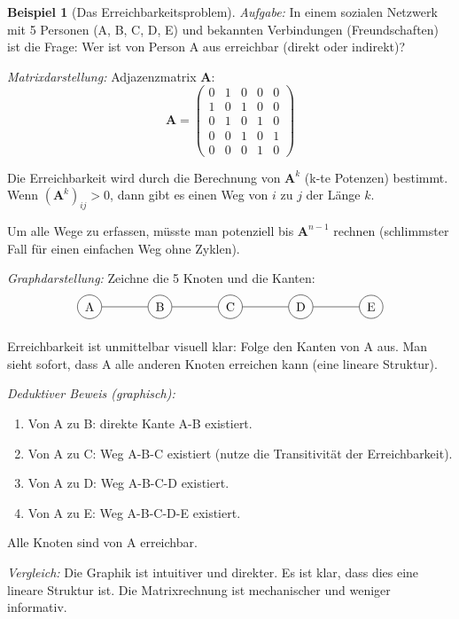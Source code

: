 \documentclass[12pt, a4paper]{article}
\theoremstyle{definition}
\newtheorem{example}[theorem]{Beispiel}
\theoremstyle{remark}
\newcommand{\vA}{\bm{A}}
\begin{document}
\begin{example}[Das Erreichbarkeitsproblem]
\label{ex:erreichbarkeitsproblem}
\emph{Aufgabe:} In einem sozialen Netzwerk mit 5 Personen (A, B, C, D, E) und bekannten Verbindungen (Freundschaften) ist die Frage: Wer ist von Person A aus erreichbar (direkt oder indirekt)?

\emph{Matrixdarstellung:}
Adjazenzmatrix $\vA$:
\[
\vA = \begin{pmatrix}
0 & 1 & 0 & 0 & 0 \\
1 & 0 & 1 & 0 & 0 \\
0 & 1 & 0 & 1 & 0 \\
0 & 0 & 1 & 0 & 1 \\
0 & 0 & 0 & 1 & 0
\end{pmatrix}
\]

Die Erreichbarkeit wird durch die Berechnung von $\vA^k$ (k-te Potenzen) bestimmt. Wenn $(\vA^k)_{ij} > 0$, dann gibt es einen Weg von $i$ zu $j$ der Länge $k$.

Um alle Wege zu erfassen, müsste man potenziell bis $\vA^{n-1}$ rechnen (schlimmster Fall für einen einfachen Weg ohne Zyklen).

\emph{Graphdarstellung:}
Zeichne die 5 Knoten und die Kanten:
\[
\begin{tikzpicture}[node distance=2cm]
  \node (A) [circle, draw] {A};
  \node (B) [circle, draw, right of=A] {B};
  \node (C) [circle, draw, right of=B] {C};
  \node (D) [circle, draw, right of=C] {D};
  \node (E) [circle, draw, right of=D] {E};
  
  \path[draw] (A) -- (B) -- (C) -- (D) -- (E);
\end{tikzpicture}
\]

Erreichbarkeit ist unmittelbar visuell klar: Folge den Kanten von A aus. Man sieht sofort, dass A alle anderen Knoten erreichen kann (eine lineare Struktur).

\emph{Deduktiver Beweis (graphisch):}
\begin{enumerate}[label=(\alph*)]
  \item Von A zu B: direkte Kante A-B existiert.
  \item Von A zu C: Weg A-B-C existiert (nutze die Transitivität der Erreichbarkeit).
  \item Von A zu D: Weg A-B-C-D existiert.
  \item Von A zu E: Weg A-B-C-D-E existiert.
\end{enumerate}

Alle Knoten sind von A erreichbar.

\emph{Vergleich:}
Die Graphik ist intuitiver und direkter. Es ist klar, dass dies eine lineare Struktur ist. Die Matrixrechnung ist mechanischer und weniger informativ.
\end{example}
\end{document}
